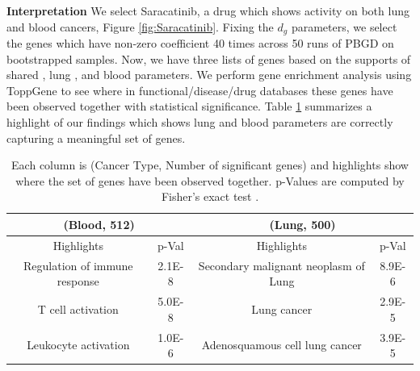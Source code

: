 {\bf Interpretation}
We select Saracatinib, a drug which shows activity on both lung and blood cancers, Figure \ref{fig:Saracatinib}. 
Fixing the $d_g$ parameters, we select the genes which have non-zero coefficient 40 times across 50 runs of PBGD on bootstrapped samples.
Now, we have three lists of genes based on the supports of shared , lung , and blood parameters. 
We perform gene enrichment analysis using ToppGene \cite{chen09toppgene} to see where in functional/disease/drug databases these genes have been observed together with statistical significance. 
Table \ref{table:1} summarizes a highlight of our findings which shows lung and blood parameters are correctly capturing a meaningful set of genes.%
\begin{table}
	\centering
	\begin{tabular}{ |c|c|c|c|  }
		\hline 	
		\multicolumn{2}{|c|}{(Blood, 512)} & \multicolumn{2}{c|}{(Lung, 500)}\\
		\hline
		Highlights &    p-Val  & Highlights &    p-Val   \\
		\hline
		Regulation of immune response	 & 2.1E-8  & Secondary malignant neoplasm of Lung & 8.9E-6  \\
		T cell activation	 & 5.0E-8   & Lung cancer  & 2.9E-5   \\
		Leukocyte activation & 1.0E-6  & Adenosquamous cell lung cancer	 & 3.9E-5 \\
		\hline
	\end{tabular}
\caption{Each column is (Cancer Type, Number of significant genes) and highlights show where the set of genes have been observed together. p-Values are computed by  Fisher's exact test \cite{chen09toppgene}.}
\label{table:1}
\end{table}

